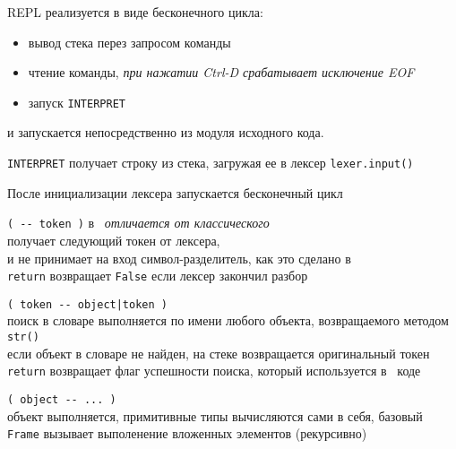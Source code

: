 

\noindent
REPL реализуется в виде бесконечного цикла:
\begin{itemize}[nosep]
  \item вывод стека перез запросом команды
  \item чтение команды, \emph{при нажатии Ctrl-D срабатывает исключение EOF}
  \item запуск \verb|INTERPRET|
\end{itemize}
и запускается непосредственно из модуля исходного кода.

\bigskip
{}

\noindent
\verb|INTERPRET| получает строку из стека, загружая ее в лексер
\verb|lexer.input()|

\noindent
После инициализации лексера запускается бесконечный цикл
\begin{description}[nosep]
\item[WORD] \verb|( -- token )| в \pyf\ \emph{отличается от классического \F}\\
получает следующий токен от лексера,\\и не принимает на вход
символ-разделитель, как это сделано в \F\\
\verb|return| возвращает \verb|False| если лексер закончил разбор\\
\item[FIND] \verb$( token -- object|token )$\\
поиск в словаре выполняется по имени любого объекта, возвращаемого методом
\verb|str()|\\
если объект в словаре не найден, на стеке возвращается оригинальный токен\\
\verb|return| возвращает флаг успешности поиска, который используется в \py\
коде\\
\item[EXECUTE] \verb|( object -- ... )|\\
объект выполняется, примитивные типы вычисляются сами в себя, базовый
\verb|Frame| вызывает выполенение вложенных элементов (рекурсивно)
\end{description}

\bigskip
{}
